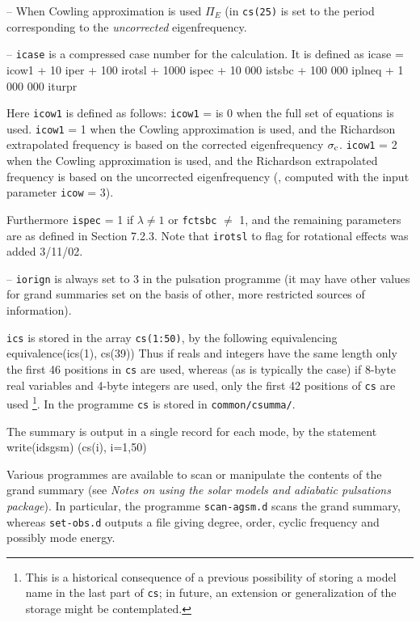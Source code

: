 \item{--}
When Cowling approximation is used $\Pi_E$ (in {\tt cs(25)}
is set to the period corresponding to the {\it uncorrected}
eigenfrequency.

\item{--}
{\tt icase} is a compressed case number for the calculation. It is defined as
\ms
{\source
icase = icow1 + 10 iper + 100 irotsl + 1000 ispec + 10 000 istsbc 
\qquad + 100 000 iplneq + 1 000 000 iturpr
}
\msni
\item{}
Here {\tt icow1} is defined as follows:
\itemitem{-}
{\tt icow1} = is 0 when the full set of equations is used.
\itemitem{-}
{\tt icow1} = 1 when the Cowling approximation is used, and the Richardson
extrapolated frequency is based on the corrected eigenfrequency
$\sigma_{\rm c}$.
\itemitem{-}
{\tt icow1} = 2 when the Cowling approximation is used, and the Richardson
extrapolated frequency is based on the uncorrected eigenfrequency
({\ie}, computed with the input parameter {\tt icow} = 3).

\ms
\item{}
Furthermore
{\tt ispec} = 1 if $\lambda \not= 1$ 
or {\tt fctsbc} $\not=$ 1, and the remaining parameters are as defined in
Section 7.2.3. Note that {\tt irotsl} to flag for rotational effects
was added 3/11/02.

\item{--}
{\tt iorign} is always set to 3 in the pulsation programme (it may
have other values for grand summaries set on the basis of other, more 
restricted sources of information). 

\medskip
{\tt ics} is stored in the array {\tt cs(1:50)},
by the following equivalencing
\ms
{\source
equivalence(ics(1), cs(39))
}
\msni
Thus if reals and integers have the same length only the
first 46 positions in {\tt cs} are used,
whereas (as is typically the case) if 8-byte real variables and
4-byte integers are used, only the first 42 positions of
{\tt cs} are used%
\footnote*{This is a historical consequence of a previous possibility
of storing a model name in the last part of {\tt cs};
in future, an extension or generalization of the storage might
be contemplated.}.
In the programme {\tt cs} is stored in {\tt common/csumma/}.

The summary is output in a single record for each mode, by the statement
\ms
{\source
write(idsgsm) (cs(i), i=1,50)
}
\msni

Various programmes are available to scan or manipulate the
contents of the grand summary
(see {\it Notes on using the solar models and adiabatic pulsations package}).
In particular, the programme {\tt scan-agsm.d} scans the grand summary,
whereas {\tt set-obs.d} outputs a file giving degree, order,
cyclic frequency and possibly mode energy.

